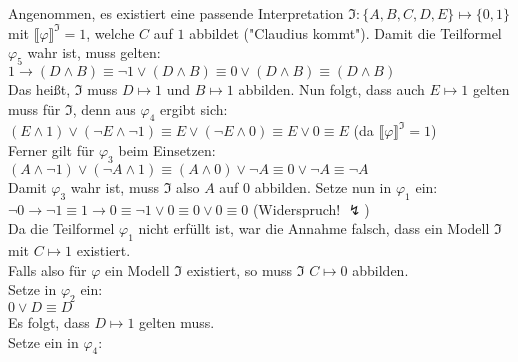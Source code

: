 \documentclass[11pt, a4paper]{article}
\newcommand{\interpretation}[1] {\mathfrak{#1}}
\begin{document}
\begin{adjustwidth}{20pt}{20pt}
Angenommen, es existiert eine passende Interpretation $\interpretation{I}:\{A,B,C,D,E \}\mapsto \{0,1\}$ mit $\llbracket \varphi \rrbracket^{\interpretation{I}}=1$, welche $C$ auf $1$ abbildet ("Claudius kommt"). Damit die Teilformel $\varphi_5$ wahr ist, muss gelten:\\

$1\rightarrow (D\wedge B) \equiv \neg 1\vee (D\wedge B) \equiv 0 \vee (D\wedge B) \equiv (D\wedge B)$\\

Das heißt, $\interpretation{I}$ muss $D\mapsto 1$ und $B\mapsto 1$ abbilden. Nun folgt, dass auch $E\mapsto 1$ gelten muss für $\interpretation{I}$, denn aus $\varphi_4$ ergibt sich:\\

$(E\wedge 1)\vee(\neg E\wedge \neg 1) \equiv E\vee(\neg E\wedge 0) \equiv E\vee 0 \equiv E$ \qquad (da $\llbracket \varphi \rrbracket^{\interpretation{I}}=1$)\\

Ferner gilt für $\varphi_3$ beim Einsetzen:\\

$(A\wedge\neg 1)\vee(\neg A \wedge 1) \equiv (A\wedge 0)\vee \neg A  \equiv 0\vee \neg A  \equiv \neg A$\\

Damit $\varphi_3$ wahr ist, muss $\interpretation{I}$ also $A$ auf $0$ abbilden. Setze nun in $\varphi_1$ ein:\\

$\neg 0 \rightarrow  \neg 1 \equiv 1 \rightarrow  0 \equiv \neg 1 \vee 0 \equiv 0 \vee 0 \equiv 0$ (Widerspruch! $\lightning$)\\

Da die Teilformel $\varphi_1$ nicht erfüllt ist, war die Annahme falsch, dass ein Modell $\interpretation{I}$ mit $C\mapsto 1$ existiert.\\

Falls also für $\varphi$ ein Modell $\interpretation{I}$ existiert, so muss $\interpretation{I}$ $C\mapsto 0$ abbilden.\\
Setze in $\varphi_2$ ein:\\

$0\vee D \equiv D$\\

Es folgt, dass $D\mapsto 1$ gelten muss.\\
Setze ein in $\varphi_4$:\\


\end{adjustwidth}
\end{document}
